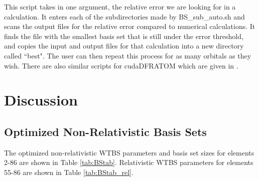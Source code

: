 

This script takes in one argument, the relative error we are looking for in a calculation. It enters each of the subdirectories made by BS\_sub\_auto.sh and scans the output files for the relative error compared to numerical calculations. It finds the file with the smallest basis set that is still under the error threshold, and copies the input and output files for that calculation into a new directory called ``best". The user can then repeat this process for as many orbitals as they wish. There are also similar scripts for cudaDFRATOM which are given in .

\section{Discussion}
\subsection{Optimized Non-Relativistic Basis Sets}
The optimized non-relativistic WTBS parameters and basis set sizes for elements 2-86 are shown in Table \ref{tab:BStab}. Relativistic WTBS parameters for elements 55-86 are shown in Table \ref{tab:BStab_rel}.

